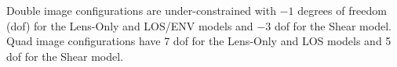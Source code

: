 Double image configurations are under-constrained with $-1$ degrees of freedom (dof) for the Lens-Only and LOS/ENV models and $-3$ dof for the Shear model. Quad image configurations have 7 dof for the Lens-Only and LOS models and 5 dof for the Shear model.
